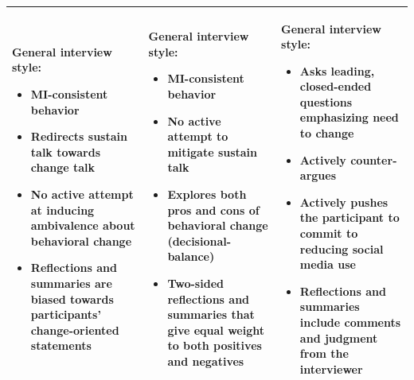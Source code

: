 \begin{tabularx}{\textwidth}{
  >{\raggedright\arraybackslash}X
  >{\raggedright\arraybackslash}X
  >{\raggedright\arraybackslash}X}
\begin{minipage}[t]{\linewidth}
\textbf{General interview style:}
\begin{itemize}[leftmargin=*,nosep]
\item MI-consistent behavior 
\item Redirects sustain talk towards change talk
\item No active attempt at inducing ambivalence about behavioral change
\item Reflections and summaries are biased towards participants’ change-oriented statements
\end{itemize}
\end{minipage}
&
\vspace{-0.5em}
\begin{minipage}[t]{\linewidth}\vspace{0pt}
\textbf{General interview style:}
\begin{itemize}[leftmargin=*,nosep]
\item MI-consistent behavior
\item No active attempt to mitigate sustain talk
\item Explores both pros and cons of behavioral change (decisional-balance)
\item Two-sided reflections and summaries that give equal weight to both positives and negatives
\end{itemize}
\end{minipage}
&
\vspace{-0.5em}
\begin{minipage}[t]{\linewidth}\vspace{0pt}\raggedright
\textbf{General interview style:}
\begin{itemize}[leftmargin=*,nosep]
\item Asks leading, closed-ended questions emphasizing need to change
\item Actively counter-argues
\item Actively pushes the participant to commit to reducing social media use
\item Reflections and summaries include comments and judgment from the interviewer
\end{itemize}
\end{minipage}
\\
\bottomrule
\end{tabularx}
